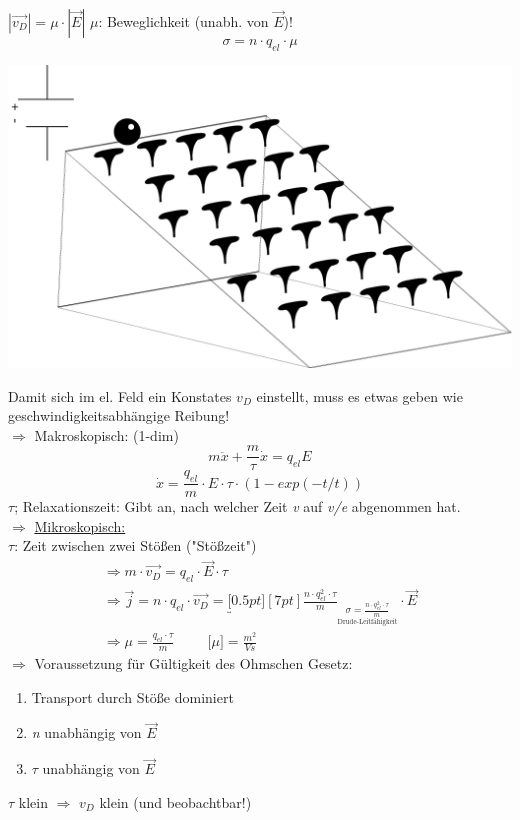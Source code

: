 \documentclass[11pt]{article}
\begin{document}
		$ |\vec{v_D}|=\mu \cdot |\vec{E}| $ \hspace{1cm} $ \mu $: Beweglichkeit (unabh. von $ \vec{E} $)! \\
		$$ \boxed{\sigma = n\cdot q_{el} \cdot \mu  } $$
		\begin{center}
			\includegraphics[width=0.5\linewidth]{skizzen/15/VL06/15_7}
		\end{center}
		Damit sich im el. Feld ein Konstates $ v_D $ einstellt, muss es etwas geben wie geschwindigkeitsabhängige Reibung! \\
		$ \Rightarrow $ Makroskopisch: (1-dim) \\
		$$ m\ddot{x}+\frac{m}{\tau}\dot{x} = q_{el}E$$
		$$\boxed{\dot{x} =\frac{q_{el}}{m} \cdot E \cdot \tau \cdot (1-exp(-t/t))}$$
		$ \tau $; Relaxationszeit: Gibt an, nach welcher Zeit \emph{v} auf \emph{v/e} abgenommen hat. \\
		$ \Rightarrow $ \underline{Mikroskopisch:} \\
		$ \tau $: Zeit zwischen zwei Stößen ("Stößzeit") \\
		
		\begin{align*}
		\Rightarrow m \cdot \vec{v_D} = q_{el} \cdot \vec{E} \cdot \tau \\
		\Rightarrow \vec{j} = n\cdot q_{el} \cdot \vec{v_D} = \underbracket[0.5pt][7pt]{\frac{n \cdot q_{el}^2 \cdot \tau}{m}}_{\boxed{\underset{\text{Drude-Leitfähigkeit}}{\sigma = \frac{n \cdot q_{el}^2 \cdot \tau}{m}}}} \cdot \vec{E}\\
		\Rightarrow \boxed{\mu = \frac{q_{el}\cdot \tau}{m}} \hspace{1cm} \text{[$\mu$]} = \frac{m^2}{Vs}
		\end{align*}
		$ \Rightarrow $ Voraussetzung für Gültigkeit des Ohmschen Gesetz:
		\begin{enumerate}
			\item Transport durch Stöße dominiert
			\item \emph{n} unabhängig von $ \vec{E} $
			\item $ \tau $ unabhängig von $ \vec{E} $
		\end{enumerate}
		$ \tau $ klein $\Rightarrow$ $ v_D $ klein (und beobachtbar!) 
		\newpage
		
\end{document}
